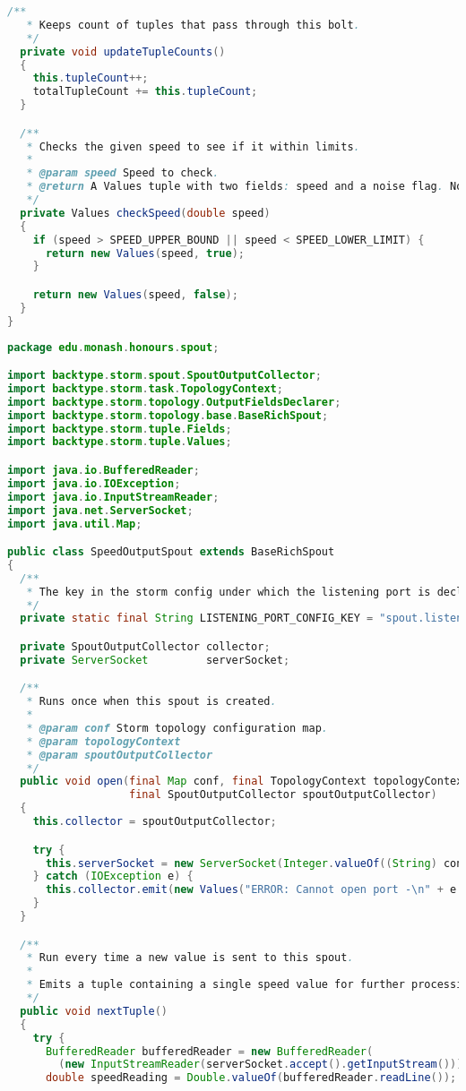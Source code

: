 \begin{lstlisting}[language=java,caption=edu.monash.honours.bolt.SpeedCheckBolt (Java),label=storm-bolt]
  /**
   * Keeps count of tuples that pass through this bolt.
   */
  private void updateTupleCounts()
  {
    this.tupleCount++;
    totalTupleCount += this.tupleCount;
  }

  /**
   * Checks the given speed to see if it within limits.
   *
   * @param speed Speed to check.
   * @return A Values tuple with two fields: speed and a noise flag. Noise flag is checked if speed exceeds limits.
   */
  private Values checkSpeed(double speed)
  {
    if (speed > SPEED_UPPER_BOUND || speed < SPEED_LOWER_LIMIT) {
      return new Values(speed, true);
    }

    return new Values(speed, false);
  }
}
\end{lstlisting}

\clearpage
\begin{lstlisting}[language=java,caption=edu.monash.honours.spout.SpeedOutputSpout (Java),label=storm-spout]
package edu.monash.honours.spout;

import backtype.storm.spout.SpoutOutputCollector;
import backtype.storm.task.TopologyContext;
import backtype.storm.topology.OutputFieldsDeclarer;
import backtype.storm.topology.base.BaseRichSpout;
import backtype.storm.tuple.Fields;
import backtype.storm.tuple.Values;

import java.io.BufferedReader;
import java.io.IOException;
import java.io.InputStreamReader;
import java.net.ServerSocket;
import java.util.Map;

public class SpeedOutputSpout extends BaseRichSpout
{
  /**
   * The key in the storm config under which the listening port is declared
   */
  private static final String LISTENING_PORT_CONFIG_KEY = "spout.listeningPort";

  private SpoutOutputCollector collector;
  private ServerSocket         serverSocket;

  /**
   * Runs once when this spout is created.
   *
   * @param conf Storm topology configuration map.
   * @param topologyContext
   * @param spoutOutputCollector
   */
  public void open(final Map conf, final TopologyContext topologyContext,
                   final SpoutOutputCollector spoutOutputCollector)
  {
    this.collector = spoutOutputCollector;

    try {
      this.serverSocket = new ServerSocket(Integer.valueOf((String) conf.get(LISTENING_PORT_CONFIG_KEY)));
    } catch (IOException e) {
      this.collector.emit(new Values("ERROR: Cannot open port -\n" + e.getMessage()));
    }
  }

  /**
   * Run every time a new value is sent to this spout.
   *
   * Emits a tuple containing a single speed value for further processing.
   */
  public void nextTuple()
  {
    try {
      BufferedReader bufferedReader = new BufferedReader(
        (new InputStreamReader(serverSocket.accept().getInputStream())));
      double speedReading = Double.valueOf(bufferedReader.readLine());


\end{lstlisting}
